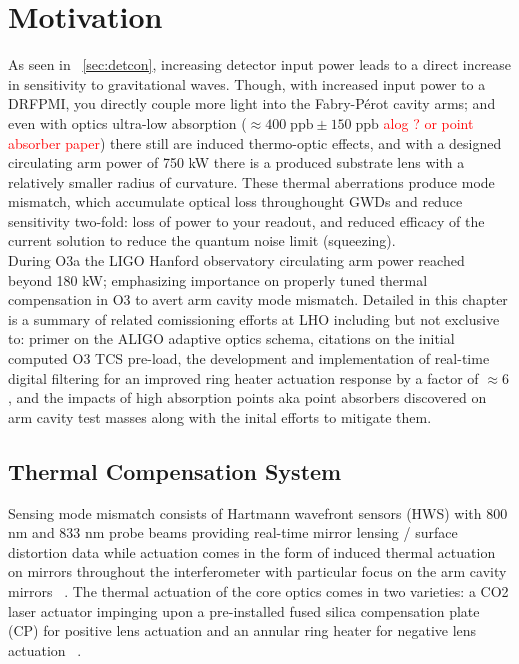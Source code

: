 



\section{Motivation}
As seen in ~\autoref{sec:detcon}, increasing detector input power leads to a direct increase in sensitivity to gravitational waves. Though, with increased input power to a DRFPMI, you directly couple more light into the Fabry-P\'{e}rot cavity arms; and even with optics ultra-low absorption ($\approx 400 \; \mathrm{ppb} \pm 150 \; \mathrm{ppb}$ \textcolor{red}{alog ? or point absorber paper}) there still are induced thermo-optic effects, and with a designed circulating arm power of 750 kW there is a produced substrate lens with a relatively smaller radius of curvature. These thermal aberrations produce mode mismatch, which accumulate optical loss throughought GWDs and reduce sensitivity two-fold: loss of power to your readout, and reduced efficacy of the current solution to reduce the quantum noise limit (squeezing).
\\
During O3a the LIGO Hanford observatory circulating arm power reached beyond 180 kW; emphasizing importance on properly tuned thermal compensation in O3 to avert arm cavity mode mismatch. Detailed in this chapter is a summary of related comissioning efforts at LHO including but not exclusive to: primer on the ALIGO adaptive optics schema, citations on the initial computed O3 TCS pre-load, the development and implementation of real-time digital filtering for an improved ring heater actuation response by a factor of $\approx 6$, and the impacts of high absorption points aka point absorbers discovered on arm cavity test masses along with the inital efforts to mitigate them.

\subsection{Thermal Compensation System}
Sensing mode mismatch consists of Hartmann wavefront sensors (HWS) with 800 nm and 833 nm probe beams providing real-time mirror lensing / surface distortion data while actuation comes in the form of induced thermal actuation on mirrors throughout the interferometer with particular focus on the arm cavity mirrors ~\cite{aasi:2015}. The thermal actuation of the core optics comes in two varieties: a CO2 laser actuator impinging upon a pre-installed fused silica compensation plate (CP) for positive lens actuation and an annular ring heater for negative lens actuation ~\cite{brooks:aigwd2019}. 
